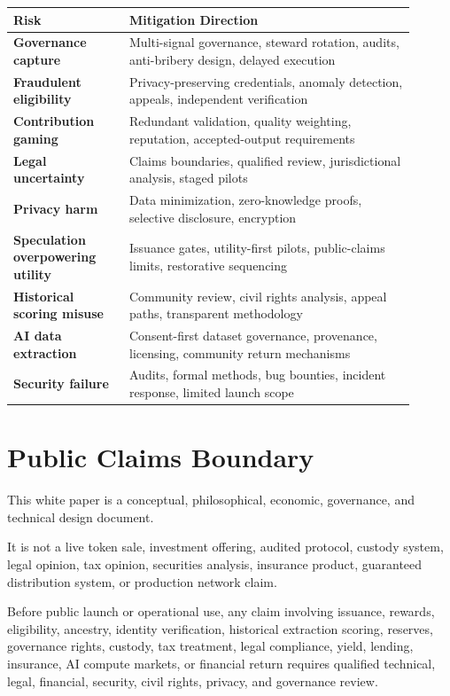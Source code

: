 \documentclass[12pt]{article}
\begin{document}
\begin{longtable}{>{\bfseries}p{0.26\linewidth}p{0.64\linewidth}}
\toprule
Risk & Mitigation Direction \\
\midrule
Governance capture & Multi-signal governance, steward rotation, audits, anti-bribery design, delayed execution \\
Fraudulent eligibility & Privacy-preserving credentials, anomaly detection, appeals, independent verification \\
Contribution gaming & Redundant validation, quality weighting, reputation, accepted-output requirements \\
Legal uncertainty & Claims boundaries, qualified review, jurisdictional analysis, staged pilots \\
Privacy harm & Data minimization, zero-knowledge proofs, selective disclosure, encryption \\
Speculation overpowering utility & Issuance gates, utility-first pilots, public-claims limits, restorative sequencing \\
Historical scoring misuse & Community review, civil rights analysis, appeal paths, transparent methodology \\
AI data extraction & Consent-first dataset governance, provenance, licensing, community return mechanisms \\
Security failure & Audits, formal methods, bug bounties, incident response, limited launch scope \\
\bottomrule
\end{longtable}

\section{Public Claims Boundary}

This white paper is a conceptual, philosophical, economic, governance, and technical design document.

It is not a live token sale, investment offering, audited protocol, custody system, legal opinion, tax opinion, securities analysis, insurance product, guaranteed distribution system, or production network claim.

Before public launch or operational use, any claim involving issuance, rewards, eligibility, ancestry, identity verification, historical extraction scoring, reserves, governance rights, custody, tax treatment, legal compliance, yield, lending, insurance, AI compute markets, or financial return requires qualified technical, legal, financial, security, civil rights, privacy, and governance review.
\end{document}
